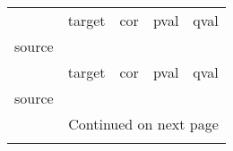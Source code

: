 \begin{longtable}{lllll}
\toprule
{} &                                             target &                   cor &                     pval &                    qval \\
source                                             &                                                    &                       &                          &                         \\
\midrule
\endfirsthead

\toprule
{} &                                             target &                   cor &                     pval &                    qval \\
source                                             &                                                    &                       &                          &                         \\
\midrule
\endhead
\midrule
\multicolumn{5}{r}{{Continued on next page}} \\
\midrule
\endfoot


\end{longtable}
